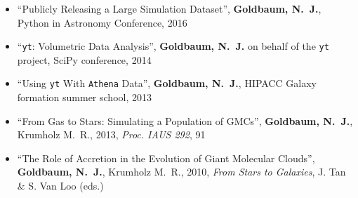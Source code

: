 \documentclass[10pt,letterpaper]{article}
\begin{document}
\begin{itemize}

\item[] ``Publicly Releasing a Large Simulation Dataset'', {\bf Goldbaum,
    N.~J.}, Python in Astronomy Conference, 2016
\item[] ``\texttt{yt}: Volumetric Data Analysis'', {\bf Goldbaum, N.~J.} on
  behalf of the \texttt{yt} project, SciPy conference, 2014
\item[] ``Using \texttt{yt} With \texttt{Athena} Data'', {\bf Goldbaum, N.~J.},
  HIPACC Galaxy formation summer school, 2013
\item[] ``From Gas to Stars: Simulating a Population of GMCs'', {\bf Goldbaum,
    N.~J.}, Krumholz M.~R., 2013, \textit{Proc. IAUS 292}, 91
\item[] ``The Role of Accretion in the Evolution of Giant Molecular Clouds'',
  {\bf Goldbaum, N.~J.}, Krumholz M.~R., 2010, \textit{From Stars to Galaxies},
  J. Tan \& S. Van Loo (eds.)

\end{itemize}
\end{document}

